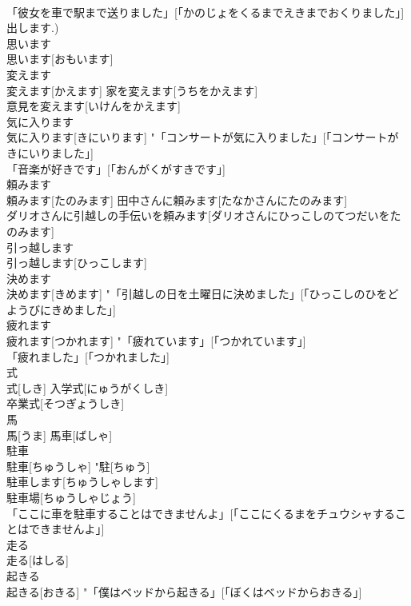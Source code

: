 \documentclass[8pt]{extreport}
\begin{document}
\begin{CJK}{UTF8}{min}
\\	「彼女を車で駅まで送りました」[「かのじょをくるまでえきまでおくりました」] 
\\	出します.)
\\	思います	
\\	思います[おもいます]	
\\	変えます	
\\	変えます[かえます]	家を変えます[うちをかえます] 
\\	意見を変えます[いけんをかえます] 
\\	気に入ります	
\\	気に入ります[きにいります]	"「コンサートが気に入りました」[「コンサートがきにいりました」] 
\\	「音楽が好きです」[「おんがくがすきです」] 
\\	頼みます	
\\	頼みます[たのみます]	田中さんに頼みます[たなかさんにたのみます] 
\\	ダリオさんに引越しの手伝いを頼みます[ダリオさんにひっこしのてつだいをたのみます] 
\\	引っ越します	
\\	引っ越します[ひっこします]	
\\	決めます	
\\	決めます[きめます]	"「引越しの日を土曜日に決めました」[「ひっこしのひをどようびにきめました」] 
\\	疲れます	
\\	疲れます[つかれます]	"「疲れています」[「つかれています」] 
\\	「疲れました」[「つかれました」] 
\\	式	
\\	式[しき]	入学式[にゅうがくしき] 
\\	卒業式[そつぎょうしき] 
\\	馬	
\\	馬[うま]	馬車[ばしゃ] 
\\	駐車	
\\	駐車[ちゅうしゃ]	"駐[ちゅう] 
\\	駐車します[ちゅうしゃします] 
\\	駐車場[ちゅうしゃじょう] 
\\	「ここに車を駐車することはできませんよ」[「ここにくるまをチュウシャすることはできませんよ」] 
\\	走る	
\\	走る[はしる]	
\\	起きる	
\\	起きる[おきる]	"「僕はベッドから起きる」[「ぼくはベッドからおきる」] 

\end{CJK}
\end{document}
